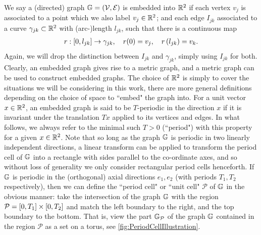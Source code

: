 We say a (directed) graph $\mathbb{G} = \left( \mathcal{V},\mathcal{E} \right)$ is embedded into $\mathbb{R}^2$ if each vertex $v_j$ is associated to a point which we also label $v_j\in\mathbb{R}^2$; and each edge $I_{jk}$ associated to a curve $\gamma_{jk}\subset\mathbb{R}^2$ with (arc-)length $l_{jk}$, such that there is a continuous map
\begin{align} \label{eq:GeneralCurveParam}
	r: \left[ 0,l_{jk} \right] \rightarrow \gamma_{jk}, \quad r(0) = v_j, \quad r\left( l_{jk} \right) = v_k.
\end{align}
Again, we will drop the distinction between $I_{jk}$ and $\gamma_{jk}$, simply using $I_{jk}$ for both.
Clearly, an embedded graph gives rise to a metric graph, and a metric graph can be used to construct embedded graphs.
The choice of $\mathbb{R}^2$ is simply to cover the situations we will be considering in this work, there are more general definitions depending on the choice of space to ``embed" the graph into.
For a unit vector $x\in\mathbb{R}^2$, an embedded graph is said to be $T$-periodic in the direction $x$ if it is invariant under the translation $Tx$ applied to its vertices and edges.
In what follows, we always refer to the minimal such $T>0$ (``period") with this property for a given $x\in\mathbb{R}^2$.
Note that so long as the graph $\mathbb{G}$ is periodic in two linearly independent directions, a linear transform can be applied to transform the period cell of $\mathbb{G}$ into a rectangle with sides parallel to the co-ordinate axes, and so without loss of generality we only consider rectangular period cells henceforth.
If $\mathbb{G}$ is periodic in the (orthogonal) axial directions $e_1, e_2$ (with periods $T_1, T_2$ respectively), then we can define the ``period cell" or ``unit cell" $\mathcal{P}$ of $\mathbb{G}$ in the obvious manner: take the intersection of the graph $\mathbb{G}$ with the region $\mathcal{P} = \left[ 0,T_1 \right]\times\left[ 0,T_2 \right]$ and match the left boundary to the right, and the top boundary to the bottom.
That is, view the part $\mathbb{G}_{\mathcal{P}}$ of the graph $\mathbb{G}$ contained in the region $\mathcal{P}$ as a set on a torus, see \ref{fig:PeriodCellIllustration}.
